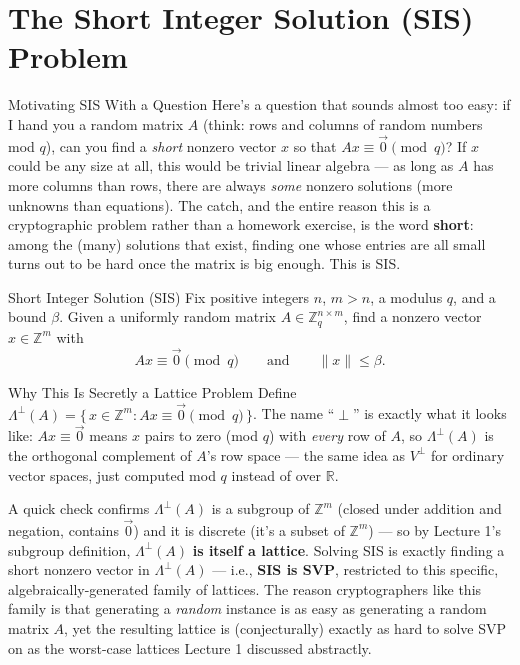 \section{The Short Integer Solution (SIS) Problem}
\label{sec:L2:the-short-integer-solution-sis-problem}

\begin{rmkbox}{Motivating SIS With a Question}
Here's a question that sounds almost too easy: if I hand you a random matrix $A$ (think: rows and columns of random numbers mod $q$), can you find a \emph{short} nonzero vector $x$ so that $Ax \equiv \vec 0 \pmod q$? If $x$ could be any size at all, this would be trivial linear algebra --- as long as $A$ has more columns than rows, there are always \emph{some} nonzero solutions (more unknowns than equations). The catch, and the entire reason this is a cryptographic problem rather than a homework exercise, is the word \textbf{short}: among the (many) solutions that exist, finding one whose entries are all small turns out to be hard once the matrix is big enough. This is SIS.
\end{rmkbox}

\begin{defbox}{Short Integer Solution (SIS)}
Fix positive integers $n$, $m > n$, a modulus $q$, and a bound $\beta$. Given a uniformly random matrix $A \in \mathbb{Z}_q^{n \times m}$, find a nonzero vector $x \in \mathbb{Z}^m$ with
$$
A x \equiv \vec{0} \pmod q \qquad \text{and} \qquad \|x\| \le \beta.
$$
\end{defbox}

\begin{rmkbox}{Why This Is Secretly a Lattice Problem}
Define $\Lambda^{\perp}(A) = \{\, x \in \mathbb{Z}^m : Ax \equiv \vec 0 \pmod q \,\}$. The name ``$\perp$'' is exactly what it looks like: $Ax\equiv \vec 0$ means $x$ pairs to zero (mod $q$) with \emph{every} row of $A$, so $\Lambda^\perp(A)$ is the orthogonal complement of $A$'s row space --- the same idea as $V^\perp$ for ordinary vector spaces, just computed mod $q$ instead of over $\mathbb{R}$.

A quick check confirms $\Lambda^\perp(A)$ is a subgroup of $\mathbb{Z}^m$ (closed under addition and negation, contains $\vec 0$) and it is discrete (it's a subset of $\mathbb{Z}^m$) --- so by Lecture 1's subgroup definition, $\Lambda^\perp(A)$ \textbf{is itself a lattice}. Solving SIS is exactly finding a short nonzero vector in $\Lambda^\perp(A)$ --- i.e., \textbf{SIS is SVP}, restricted to this specific, algebraically-generated family of lattices. The reason cryptographers like this family is that generating a \emph{random} instance is as easy as generating a random matrix $A$, yet the resulting lattice is (conjecturally) exactly as hard to solve SVP on as the worst-case lattices Lecture 1 discussed abstractly.
\end{rmkbox}

